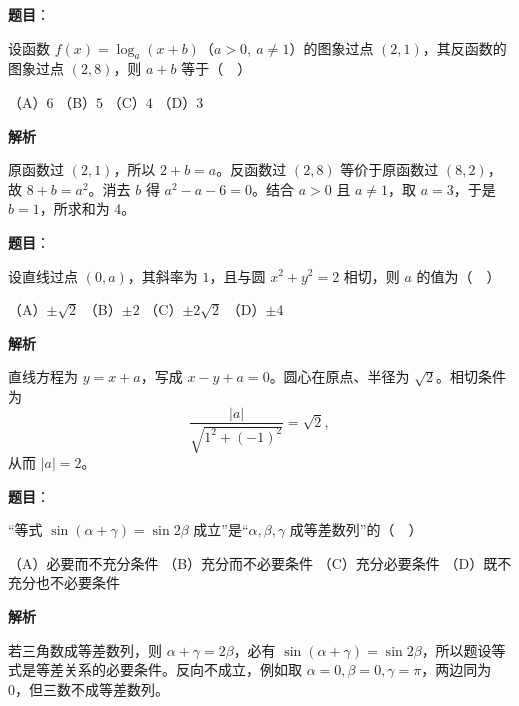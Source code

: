 \begin{answer}

\textbf{题目}：

设函数 \(f(x)=\log_a(x+b)\)（\(a>0,\ a\ne1\)）的图象过点 \((2,1)\)，其反函数的图象过点 \((2,8)\)，则 \(a+b\) 等于（　）

（A）\(6\)
（B）\(5\)
（C）\(4\)
（D）\(3\)

\textbf{解析}

原函数过 \((2,1)\)，所以 \(2+b=a\)。反函数过 \((2,8)\) 等价于原函数过 \((8,2)\)，故 \(8+b=a^2\)。消去 \(b\) 得 \(a^2-a-6=0\)。结合 \(a>0\) 且 \(a\ne1\)，取 \(a=3\)，于是 \(b=1\)，所求和为 4。


\end{answer}
\begin{answer}

\textbf{题目}：

设直线过点 \((0,a)\)，其斜率为 \(1\)，且与圆 \(x^2+y^2=2\) 相切，则 \(a\) 的值为（　）

（A）\(\pm\sqrt2\)
（B）\(\pm2\)
（C）\(\pm2\sqrt2\)
（D）\(\pm4\)

\textbf{解析}

直线方程为 \(y=x+a\)，写成 \(x-y+a=0\)。圆心在原点、半径为 \(\sqrt2\)。相切条件为
\nopagebreak[4]
\[
\frac{|a|}{\sqrt{1^2+(-1)^2}}=\sqrt2,
\]
从而 \(|a|=2\)。


\end{answer}
\begin{answer}

\textbf{题目}：

“等式 \(\sin(\alpha+\gamma)=\sin 2\beta\) 成立”是“\(\alpha,\beta,\gamma\) 成等差数列”的（　）

（A）必要而不充分条件
（B）充分而不必要条件
（C）充分必要条件
（D）既不充分也不必要条件

\textbf{解析}

若三角数成等差数列，则 \(\alpha+\gamma=2\beta\)，必有 \(\sin(\alpha+\gamma)=\sin2\beta\)，所以题设等式是等差关系的必要条件。反向不成立，例如取 \(\alpha=0,\beta=0,\gamma=\pi\)，两边同为 0，但三数不成等差数列。


\end{answer}
